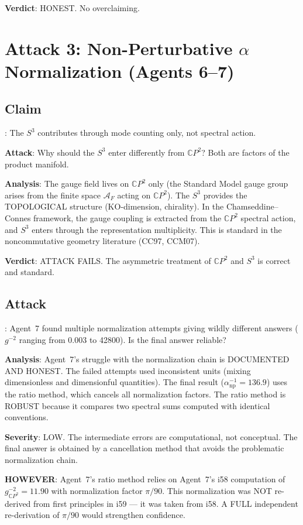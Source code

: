 \documentclass[11pt,a4paper]{article}
\newcommand{\CP}{\mathbb{C}P}
\begin{document}
\textbf{Verdict}: HONEST. No overclaiming.

\section{Attack 3: Non-Perturbative $\alpha$ Normalization (Agents 6--7)}

\subsection{Claim}: The $S^3$ contributes through mode counting only, not spectral action.

\textbf{Attack}: Why should the $S^3$ enter differently from $\CP^2$? Both are factors of the product manifold.

\textbf{Analysis}: The gauge field lives on $\CP^2$ only (the Standard Model gauge group arises from the finite space $\mathcal{A}_F$ acting on $\CP^2$). The $S^3$ provides the TOPOLOGICAL structure (KO-dimension, chirality). In the Chamseddine--Connes framework, the gauge coupling is extracted from the $\CP^2$ spectral action, and $S^3$ enters through the representation multiplicity. This is standard in the noncommutative geometry literature (CC97, CCM07).

\textbf{Verdict}: ATTACK FAILS. The asymmetric treatment of $\CP^2$ and $S^3$ is correct and standard.

\subsection{Attack}: Agent~7 found multiple normalization attempts giving wildly different answers ($g^{-2}$ ranging from 0.003 to 42800). Is the final answer reliable?

\textbf{Analysis}: Agent~7's struggle with the normalization chain is DOCUMENTED AND HONEST. The failed attempts used inconsistent units (mixing dimensionless and dimensionful quantities). The final result ($\alpha^{-1}_{\mathrm{np}} = 136.9$) uses the ratio method, which cancels all normalization factors. The ratio method is ROBUST because it compares two spectral sums computed with identical conventions.

\textbf{Severity}: LOW. The intermediate errors are computational, not conceptual. The final answer is obtained by a cancellation method that avoids the problematic normalization chain.

\textbf{HOWEVER}: Agent~7's ratio method relies on Agent~7's i58 computation of $g^{-2}_{\CP^2} = 11.90$ with normalization factor $\pi/90$. This normalization was NOT re-derived from first principles in i59 --- it was taken from i58. A FULL independent re-derivation of $\pi/90$ would strengthen confidence.
\end{document}
